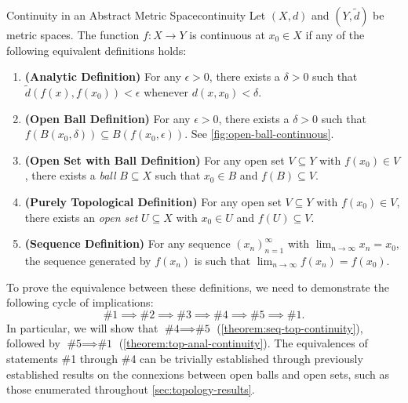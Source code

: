 \documentclass{article}
\numberwithin{equation}{section}
\numberwithin{figure}{section}
\begin{document}
\begin{definition}{Continuity in an Abstract Metric Space}{continuity}
    Let $ (X, d) $ and $ (Y, \widetilde{d}) $ be metric spaces. The function $ f
    \colon X \to Y $ is continuous at $ x_0 \in X $ if any of the following
    equivalent definitions holds:
    \begin{enumerate}
        \item \textbf{(Analytic Definition)} For any $ \epsilon > 0 $, there
            exists a $ \delta > 0 $ such that $
            \widetilde{d}\left(f\left(x\right), f\left(x_0\right)\right) <
            \epsilon $ whenever $ d\left(x, x_0\right) < \delta $.
        \item \textbf{(Open Ball Definition)} For any $ \epsilon > 0 $, there
            exists a $ \delta > 0 $ such that $ f\left(B\left(x_0,
            \delta\right)\right) \subseteq B\left(f\left(x_0,
            \epsilon\right)\right) $. See \cref{fig:open-ball-continuous}.
        \item \textbf{(Open Set with Ball Definition)} For any open set $ V
            \subseteq Y $ with $ f\left( x_0 \right) \in V $, there exists a
            \emph{ball} $ B \subseteq X $ such that $ x_0 \in B $ and $ f(B)
            \subseteq V $.
        \item \textbf{(Purely Topological Definition)} For any open set $ V
            \subseteq Y $ with $ f\left(x_0\right) \in V $, there exists an
            \emph{open set} $ U \subseteq X $ with $ x_0 \in U $ and $ f(U)
            \subseteq V $.
        \item \textbf{(Sequence Definition)} For any sequence $ \left( x_n
            \right)_{n=1}^\infty $ with $ \lim_{n \to \infty} x_n = x_0 $, the
            sequence generated by $ f\left( x_n \right) $ is such that $ \lim_{n
            \to \infty}f\left(x_n\right) = f\left(x_0\right) $.
    \end{enumerate}
    To prove the equivalence between these definitions, we need to demonstrate
    the following cycle of implications:
    \begin{equation}
        \text{\#1} \implies \text{\#2} \implies \text{\#3} \implies \text{\#4}
        \implies \text{\#5} \implies \text{\#1}.
    \end{equation}
    In particular, we will show that $ \text{\#4} \implies \text{\#5} $
    (\cref{theorem:seq-top-continuity}), followed by $ \text{\#5} \implies
    \text{\#1} $ (\cref{theorem:top-anal-continuity}). The equivalences of
    statements \#1 through \#4 can be trivially established through previously
    established results on the connexions between open balls and open sets, such
    as those enumerated throughout \cref{sec:topology-results}.


\end{definition}
\end{document}
